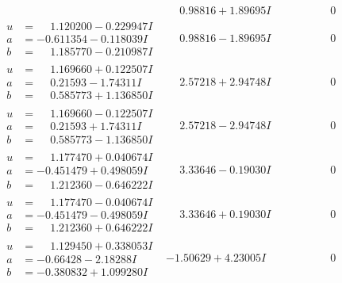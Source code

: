 \documentclass[1p]{elsarticle_modified}
\theoremstyle{definition}
\begin{document}
$$\begin{array}{c|c|c}
 & \phantom{-}0.98816 + 1.89695 I & \phantom{-0.000000 } 0 \\ \hline\begin{aligned}
u &= \phantom{-}1.120200 - 0.229947 I \\
a &= -0.611354 - 0.118039 I \\
b &= \phantom{-}1.185770 - 0.210987 I\end{aligned}
 & \phantom{-}0.98816 - 1.89695 I & \phantom{-0.000000 } 0 \\ \hline\begin{aligned}
u &= \phantom{-}1.169660 + 0.122507 I \\
a &= \phantom{-}0.21593 - 1.74311 I \\
b &= \phantom{-}0.585773 + 1.136850 I\end{aligned}
 & \phantom{-}2.57218 + 2.94748 I & \phantom{-0.000000 } 0 \\ \hline\begin{aligned}
u &= \phantom{-}1.169660 - 0.122507 I \\
a &= \phantom{-}0.21593 + 1.74311 I \\
b &= \phantom{-}0.585773 - 1.136850 I\end{aligned}
 & \phantom{-}2.57218 - 2.94748 I & \phantom{-0.000000 } 0 \\ \hline\begin{aligned}
u &= \phantom{-}1.177470 + 0.040674 I \\
a &= -0.451479 + 0.498059 I \\
b &= \phantom{-}1.212360 - 0.646222 I\end{aligned}
 & \phantom{-}3.33646 - 0.19030 I & \phantom{-0.000000 } 0 \\ \hline\begin{aligned}
u &= \phantom{-}1.177470 - 0.040674 I \\
a &= -0.451479 - 0.498059 I \\
b &= \phantom{-}1.212360 + 0.646222 I\end{aligned}
 & \phantom{-}3.33646 + 0.19030 I & \phantom{-0.000000 } 0 \\ \hline\begin{aligned}
u &= \phantom{-}1.129450 + 0.338053 I \\
a &= -0.66428 - 2.18288 I \\
b &= -0.380832 + 1.099280 I\end{aligned}
 & -1.50629 + 4.23005 I & \phantom{-0.000000 } 0 \\ \hline\begin{aligned}

\end{aligned}
\end{array}$$
\end{document}
